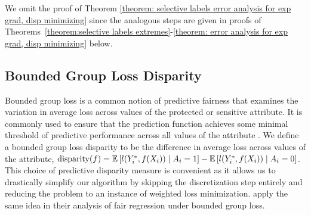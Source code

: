 \documentclass{article}
\begin{document}
We omit the proof of Theorem \ref{theorem: selective labels error analysis for exp grad, disp minimizing}  since the analogous steps are given in proofs of Theorems~\ref{theorem:selective labels extremes}-\ref{theorem: error analysis for exp grad, disp minimizing} below.

\subsection{Bounded Group Loss Disparity}\label{section: bounded group loss special case}

Bounded group loss is a common notion of predictive fairness that examines the variation in average loss across values of the protected or sensitive attribute. It is commonly used to ensure that the prediction function achieves some minimal threshold of predictive performance across all values of the attribute \cite{AgarwalEtAl(19)-FairRegression}. We define a bounded group loss disparity to be the difference in average loss across values of the attribute, $\operatorname{disparity}(f) = \mathbb{E}\left[ l(Y^*_i, f(X_i)) \mid A_i = 1 \right] - \mathbb{E}\left[ l(Y^*_i, f(X_i)) \mid A_i = 0 \right]$. This choice of predictive disparity measure is convenient as it allows us to drastically simplify our algorithm by skipping the discretization step entirely and reducing the problem to an instance of weighted loss minimization. \cite{AgarwalEtAl(19)-FairRegression} apply the same idea in their analysis of fair regression under bounded group loss. 
\end{document}

